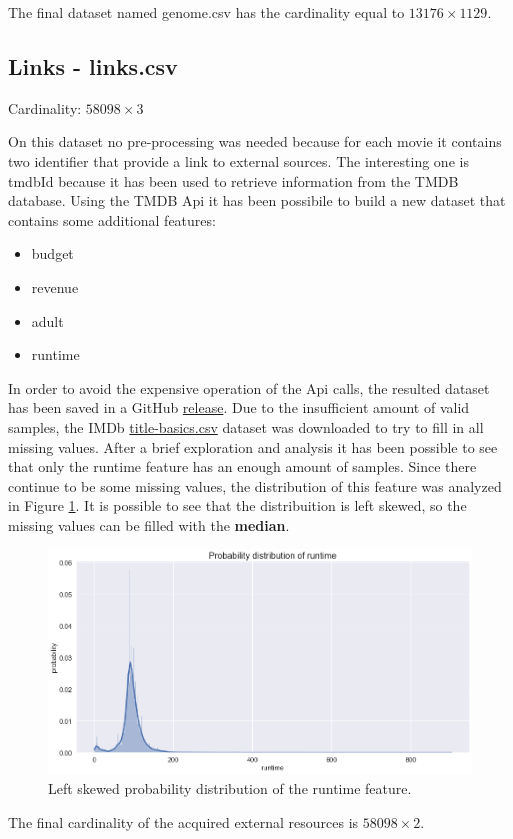\documentclass[../main]{subfiles}
\begin{document}
The final dataset named genome.csv has the cardinality equal to $13176 \times 1129$.

\subsection*{Links - links.csv}
Cardinality: $58098 \times 3$

On this dataset no pre-processing was needed because for each movie it contains two identifier that provide a link to external sources.
The interesting one is tmdbId because it has been used to retrieve information from the TMDB database.
Using the TMDB Api it has been possibile to build a new dataset that contains some additional features:
\begin{itemize}
    \item budget
    \item revenue
    \item adult
    \item runtime
\end{itemize}
In order to avoid the expensive operation of the Api calls, the resulted dataset has been saved in a GitHub \href{https://github.com/prushh/movie-lens-mlp/releases/tag/api-dataset}{release}.
Due to the insufficient amount of valid samples, the IMDb \href{https://datasets.imdbws.com/title.basics.tsv.gz}{title-basics.csv} dataset was downloaded to try to fill in all missing values.
After a brief exploration and analysis it has been possible to see that only the runtime feature has an enough amount of samples.
Since there continue to be some missing values, the distribution of this feature was analyzed in Figure \ref{fig:runtime_distribution_missing}.
It is possible to see that the distribuition is left skewed, so the missing values can be filled with the \textbf{median}.

\begin{figure}[h]
    \includegraphics[width=0.2\linewidth]{figures/runtime_distribution_missing.png}
    \caption{Left skewed probability distribution of the runtime feature.}
    \label{fig:runtime_distribution_missing}
\end{figure}

The final cardinality of the acquired external resources is $58098 \times 2$.
\end{document}
